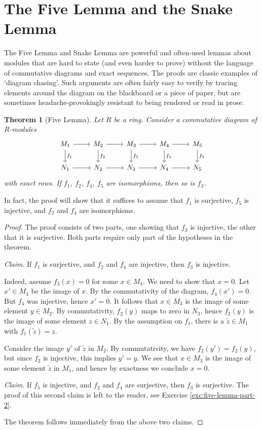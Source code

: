\documentclass[11pt]{amsbook}
\theoremstyle{plain}
\newtheorem{theorem}{Theorem}
\theoremstyle{definition}
\begin{document}
\section{The Five Lemma and the Snake Lemma}

The Five Lemma and Snake Lemma are powerful and often-used lemmas about modules that are hard to state (and even harder to prove) without the language of commutative diagrams and exact sequences. The proofs are classic examples of `diagram chasing'. Such arguments are often fairly easy to verify by tracing elements around the diagram on the blackboard or a piece of paper, but are sometimes headache-provokingly resistant to being rendered or read in prose. 


\begin{theorem}[Five Lemma]\label{thm:five-lemma}
Let $R$ be a ring. Consider a commutative diagram of $R$-modules
\[
\begin{tikzcd}
	M_1 \arrow{r} \arrow{d}{f_1}
	& M_2 \arrow{r} \arrow{d}{f_2}
	& M_3 \arrow{r} \arrow{d}{f_3}
	& M_4 \arrow{r} \arrow{d}{f_4}
	& M_5  \arrow{d}{f_5} \\
	N_1 \arrow{r}
	& N_2 \arrow{r}
	& N_3 \arrow{r}
	& N_4 \arrow{r}
	& N_5 
\end{tikzcd}
\]
with exact rows. If $f_1$, $f_2$, $f_4$, $f_5$ are isomorphisms, then so is $f_3$.
\end{theorem}

In fact, the proof will show that it suffices to assume that $f_1$ is surjective, $f_5$ is injective, and $f_2$ and $f_4$ are isomorphisms.


\begin{proof}The proof consists of two parts, one showing that $f_3$ is injective, the other that it is surjective. Both parts require only part of the hypotheses in the theorem.

\emph{Claim}. If $f_1$ is surjective, and $f_2$ and $f_4$ are injective, then $f_3$ is injective.

Indeed, assume $f_3(x)=0$ for some $x\in M_3$. We need to show that $x=0$. Let $x'\in M_4$ be the image of $x$. By the commutativity of the diagram, $f_4(x')=0$. But $f_4$ was injective, hence $x'=0$. It follows that $x\in M_3$ is the image of some element $y\in M_2$.  By commutativity, $f_2(y)$ maps to zero in $N_3$, hence $f_2(y)$ is the image of some element $z \in N_1$. By the assumption on $f_1$, there is a $\tilde{z} \in M_1$ with $f_1(\tilde{z})=z$. 

Consider the image $y'$ of $\tilde{z}$ in $M_2$. By commutativity, we have $f_2(y')=f_2(y)$, but since $f_2$ is injective, this implies $y'=y$. We see that $x\in M_3$ is the image of some element $\tilde{z}$ in $M_1$, and hence by exactness we conclude $x=0$.

\emph{Claim}. If $f_5$ is injective, and $f_2$ and $f_4$ are surjective, then $f_3$ is surjective.
The proof of this second claim is left to the reader, see Exercise \ref{exc:five-lemma-part-2}.

The theorem follows immediately from the above two claims.
\end{proof}
\end{document}
